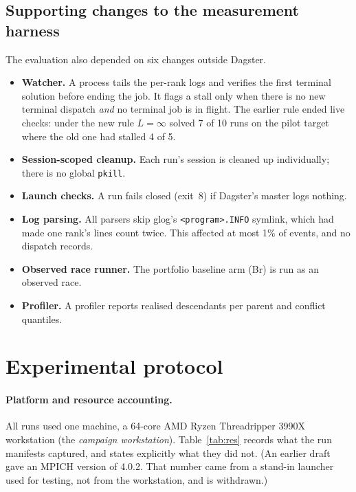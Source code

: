 \documentclass[11pt,a4paper]{article}
\begin{document}
\subsection{Supporting changes to the measurement harness}

The evaluation also depended on six changes outside Dagster.
\begin{itemize}
\item \textbf{Watcher.} A process tails the per-rank logs and verifies the first terminal solution
before ending the job. It flags a stall only when there is no new terminal dispatch \emph{and} no
terminal job is in flight. The earlier rule ended live checks: under the new rule $L=\infty$ solved
7 of 10 runs on the pilot target where the old one had stalled 4 of 5.
\item \textbf{Session-scoped cleanup.} Each run's session is cleaned up individually; there is no
global \texttt{pkill}.
\item \textbf{Launch checks.} A run fails closed (exit~8) if Dagster's master logs nothing.
\item \textbf{Log parsing.} All parsers skip glog's \texttt{<program>.INFO} symlink, which had made
one rank's lines count twice. This affected at most 1\% of events, and no dispatch records.
\item \textbf{Observed race runner.} The portfolio baseline arm (Br) is run as an observed race.
\item \textbf{Profiler.} A profiler reports realised descendants per parent and conflict quantiles.
\end{itemize}

\section{Experimental protocol}\label{sec:protocol}

\paragraph{Platform and resource accounting.} All runs used one machine, a 64-core AMD Ryzen Threadripper 3990X workstation (the \emph{campaign workstation}). Table~\ref{tab:res}
records what the run manifests captured, and states explicitly what they did not. (An earlier draft
gave an MPICH version of 4.0.2. That number came from a stand-in launcher used for testing, not from the workstation, and is withdrawn.)
\end{document}
